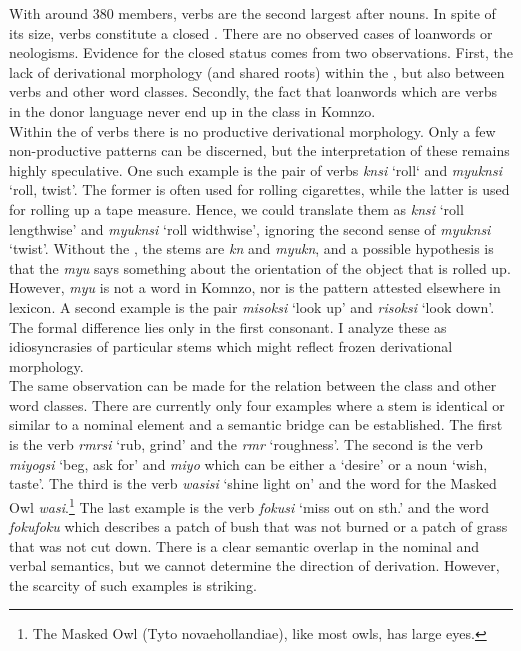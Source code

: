 With around 380 members, verbs are the second largest  after nouns. In spite of its size, verbs constitute a closed . There are no observed cases of loanwords or neologisms. Evidence for the closed status comes from two observations. First, the lack of derivational morphology (and shared roots) within the , but also between verbs and other word classes. Secondly, the fact that loanwords which are verbs in the donor language never end up in the  class in Komnzo.\\

Within the  of verbs there is no productive derivational morphology. Only a few non-productive patterns can be discerned, but the interpretation of these remains highly speculative. One such example is the pair of verbs \emph{knsi} `roll` and \emph{myuknsi} `roll, twist'. The former is often used for rolling cigarettes, while the latter is used for rolling up a tape measure. Hence, we could translate them as \emph{knsi} `roll lengthwise' and \emph{myuknsi} `roll widthwise', ignoring the second sense of \emph{myuknsi} `twist'. Without the , the stems are \emph{kn} and \emph{myukn}, and a possible hypothesis is that the \emph{myu} says something about the orientation of the object that is rolled up. However, \emph{myu} is not a word in Komnzo, nor is the pattern attested elsewhere in  lexicon. A second example is the pair \emph{misoksi} `look up' and \emph{risoksi} `look down'. The formal difference lies only in the first consonant. I analyze these as idiosyncrasies of particular stems which might reflect frozen derivational morphology.\\

The same observation can be made for the relation between the  class and other word classes. There are currently only four examples where a  stem is identical or similar to a nominal element and a semantic bridge can be established. The first is the verb \emph{rmrsi} `rub, grind' and the  \emph{rmr} `roughness'. The second is the verb \emph{miyogsi} `beg, ask for' and \emph{miyo} which can be either a  `desire' or a noun `wish, taste'. The third is the verb \emph{wasisi} `shine light on' and the word for the Masked Owl \emph{wasi}.\footnote{The Masked Owl (Tyto novaehollandiae), like most owls, has large eyes.} The last example is the verb \emph{fokusi} `miss out on sth.' and the word \emph{fokufoku} which describes a patch of bush that was not burned or a patch of grass that was not cut down. There is a clear semantic overlap in the nominal and verbal semantics, but we cannot determine the direction of derivation. However, the scarcity of such examples is striking.\\

